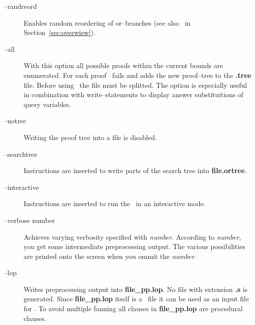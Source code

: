 \begin{description}
      \item[--randreord]
           {Enables random reordering of or--branches (see also \rc\
            in Section~\ref{sec:overwiew}).}
      \item[--all]
           {With this option all possible proofs within the current
            bounds  are enumerated. For each proof \SE\ fails and
            adds the new proof--tree to the {\bf .tree} file. Before
            using 
            \xp\  the  file  must  be  splitted. The option is
            especially useful in combination with  write--statements
            to display answer substituitions of query variables.}
      \item[--notree]
           {Writing the proof tree into a file is disabled.}
      \item[--searchtree]
           {Instructions are inserted to write parts of the  search
            tree into {\bf file.ortree}.}
      \item[--interactive]
           {Instructions are inserted to run the \SAM\ in an  interactive
            mode.}
      \item[--verbose \lb number\rb]
           {Achieves varying  verbosity  specified  with {\it number\/}.
            According to {\it number\/}, you get some intermediate
            preprocessing output. The various possibilities  are
            printed onto the screen when you ommit the {\it number\/}. } 
      \item[--lop]
           {Writes preprocessing output into {\bf file\_pp.lop}. No
            file with extension {\bf .s} is generated. Since {\bf
            file\_pp.lop} itself is a \LOP\ file it can be used as an
            input file for \inw. To avoid multiple fanning all clauses
            in {\bf file\_pp.lop} are procedural clauses.}
\end{description}
